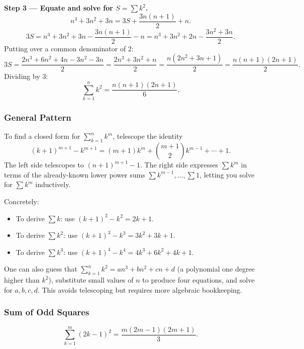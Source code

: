 \textbf{Step 3 — Equate and solve for $S = \sum k^2$.}
\[
n^3 + 3n^2 + 3n = 3S + \frac{3n(n+1)}{2} + n.
\]
\[
3S = n^3 + 3n^2 + 3n - \frac{3n(n+1)}{2} - n = n^3 + 3n^2 + 2n - \frac{3n^2 + 3n}{2}.
\]
Putting over a common denominator of 2:
\[
3S = \frac{2n^3 + 6n^2 + 4n - 3n^2 - 3n}{2} = \frac{2n^3 + 3n^2 + n}{2} = \frac{n(2n^2+3n+1)}{2} = \frac{n(n+1)(2n+1)}{2}.
\]
Dividing by 3:
\[
\boxed{\sum_{k=1}^n k^2 = \frac{n(n+1)(2n+1)}{6}.}
\]

\subsubsection*{General Pattern}

\begin{remark}
To find a closed form for $\sum_{k=1}^n k^m$, telescope the identity
\[
(k+1)^{m+1} - k^{m+1} = (m+1)k^m + \binom{m+1}{2}k^{m-1} + \cdots + 1.
\]
The left side telescopes to $(n+1)^{m+1} - 1$. The right side expresses $\sum k^m$ in terms of the already-known lower power sums $\sum k^{m-1}, \ldots, \sum 1$, letting you solve for $\sum k^m$ inductively.

Concretely:
\begin{itemize}
    \item To derive $\sum k$: use $(k+1)^2 - k^2 = 2k + 1$.
    \item To derive $\sum k^2$: use $(k+1)^3 - k^3 = 3k^2 + 3k + 1$.
    \item To derive $\sum k^3$: use $(k+1)^4 - k^4 = 4k^3 + 6k^2 + 4k + 1$.
\end{itemize}
\end{remark}

\begin{remark}
One can also guess that $\sum_{k=1}^n k^2 = an^3 + bn^2 + cn + d$ (a polynomial one degree higher than $k^2$), substitute small values of $n$ to produce four equations, and solve for $a, b, c, d$. This avoids telescoping but requires more algebraic bookkeeping.
\end{remark}

\subsubsection*{Sum of Odd Squares}

\begin{theorem}
\[
\sum_{k=1}^{m}(2k-1)^{2} = \frac{m(2m-1)(2m+1)}{3}.
\]
\end{theorem}

